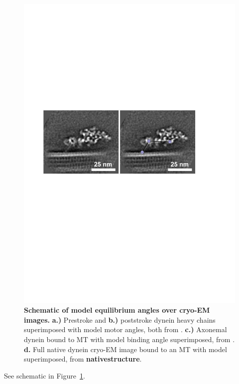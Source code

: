 \documentclass[9pt,twocolumn,twoside]{pnas-new}
\begin{document}
\begin{figure}
\includegraphics[width=0.5\columnwidth]{figures/schematic-full}
  \caption{\textbf{Schematic of model equilibrium angles over cryo-EM
      images.} \textbf{a.)} Prestroke and \textbf{b.)} poststroke
    dynein heavy chains superimposed with model motor angles, both
    from \cite{burgess-paper}. \textbf{c.)} Axonemal dynein bound to
    MT with model binding angle superimposed, from
    \cite{leschziner}. \textbf{d.} Full native dynein cryo-EM image
    bound to an MT with model superimposed, from
    \textbf{nativestructure}.}
\label{fig:modelangles}
\end{figure}

See schematic in Figure~\ref{fig:modelangles}.

\pnasbreak


\end{document}
